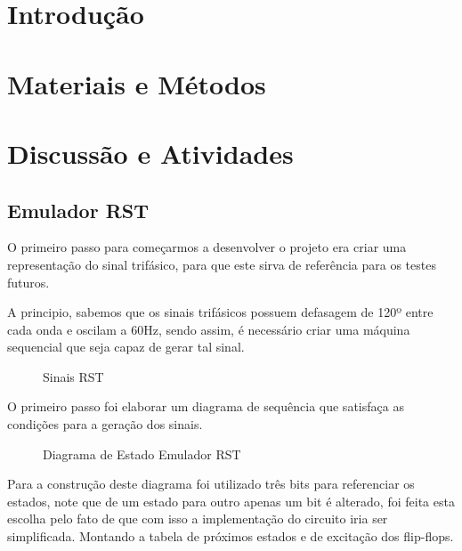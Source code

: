 \documentclass[12pt,a4paper,openany]{abntex2}
\begin{document}
	
\imprimircapa	
\imprimirfolhaderosto

\clearpage
\cleardoublepage
\cleardoublepage

\setcounter{page}{3}

\tableofcontents
\clearpage{\pagestyle{empty}\cleardoublepage}

\listoffigures
\clearpage{\pagestyle{empty}\cleardoublepage}
	
\chapter{Introdução}

\chapter{Materiais e Métodos}

\chapter{Discussão e Atividades}

\section{Emulador RST}

O primeiro passo para começarmos a desenvolver o projeto era criar uma representação do sinal trifásico, para que este sirva de referência para os testes futuros.

A principio, sabemos que os sinais trifásicos possuem defasagem de 120º entre cada onda e oscilam a 60Hz, sendo assim, é necessário criar uma máquina sequencial que seja capaz de gerar tal sinal.

\begin{figure}[!htp]
	\centering
	\caption{Sinais RST}
	\label{fig:sinais-rst}
\end{figure}

O primeiro passo foi elaborar um diagrama de sequência que satisfaça as condições para a geração dos sinais.

\begin{figure}[!htp]
	\centering
	\caption{Diagrama de Estado Emulador RST}
	\label{fig:disgrama-de-estado-EmuladorRST}
\end{figure}

Para a construção deste diagrama foi utilizado três bits para referenciar os estados, note que de um estado para outro apenas um bit é alterado, foi feita esta escolha pelo fato de que com isso a implementação do circuito iria ser simplificada. Montando a tabela de próximos estados e de excitação dos flip-flops.
\end{document}
